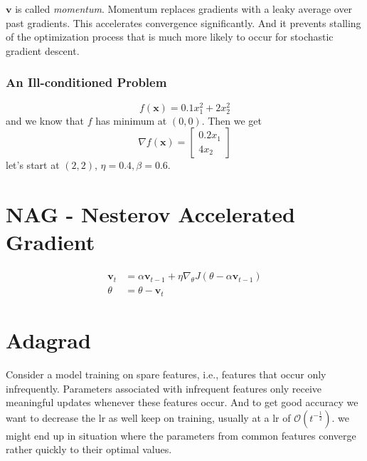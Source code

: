 $\mathbf{v}$ is called \textit{momentum}. Momentum replaces gradients with a leaky average over past gradients. This
accelerates convergence significantly. And it prevents stalling of the optimization process that is much more
likely to occur for stochastic gradient descent.

\subsubsection{An Ill-conditioned Problem}
\begin{equation}
    f(\mathbf{x}) = 0.1 x_1^2 + 2 x_2^2
\end{equation}
and we know that $f$ has minimum at $(0, 0)$. Then we get
\begin{equation}
    \nabla f(\mathbf{x}) =
    \begin{bmatrix}
        0.2x_1 \\
        4x_2
    \end{bmatrix}
\end{equation}
let's start at $(2, 2)$, $\eta = 0.4, \beta = 0.6$.

\section{NAG - Nesterov Accelerated Gradient}
\begin{equation}
    \begin{split}
        \mathbf{v}_t &= \alpha \mathbf{v}_{t-1} + \eta \nabla_\theta J(\theta - \alpha \mathbf{v}_{t-1})\\
        \theta &= \theta - \mathbf{v}_t
    \end{split}
\end{equation}

\section{Adagrad}
Consider a model training on spare features, i.e., features that occur only infrequently. Parameters associated with infrequent
features only receive meaningful updates whenever these features occur. And to get good accuracy we want to decrease the lr as well
keep on training, usually at a lr of $\mathcal{O}(t^{-\frac{1}{2}})$. we might end up in situation where the parameters from common
features converge rather quickly to their optimal values.

